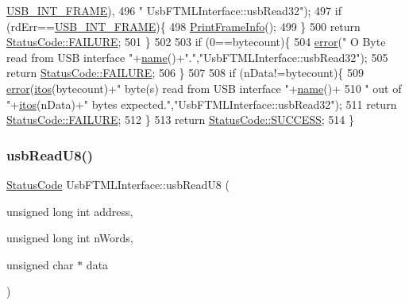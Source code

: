 \begin{DoxyCode}
      \hyperlink{LALUsbML_8h_a68260f9cf3649507d12904cfa1592c11afd1c409187b1dfd3d66887a5e07e7ed3}{USB\_INT\_FRAME}),
496             \textcolor{stringliteral}{" UsbFTMLInterface::usbRead32"});
497     \textcolor{keywordflow}{if} (rdErr==\hyperlink{LALUsbML_8h_a68260f9cf3649507d12904cfa1592c11afd1c409187b1dfd3d66887a5e07e7ed3}{USB\_INT\_FRAME})\{
498       \hyperlink{LALUsbML_8h_ab3398c17204ba7fb4b47eb9bbf4ba94e}{PrintFrameInfo}();
499     \} 
500     \textcolor{keywordflow}{return} \hyperlink{classStatusCode_a6f565cbeadc76d14c72f047e5e85eb4ba3da73d4c469762eb9d3c960368252b26}{StatusCode::FAILURE};
501   \}
502   
503   \textcolor{keywordflow}{if} (0==bytecount)\{
504     \hyperlink{classObject_a204a95f57818c0f811933917a30eff45}{error}(\textcolor{stringliteral}{" O Byte read from USB interface "}+\hyperlink{classObject_a300f4c05dd468c7bb8b3c968868443c1}{name}()+\textcolor{stringliteral}{"."},\textcolor{stringliteral}{"UsbFTMLInterface::usbRead32"});
505     \textcolor{keywordflow}{return} \hyperlink{classStatusCode_a6f565cbeadc76d14c72f047e5e85eb4ba3da73d4c469762eb9d3c960368252b26}{StatusCode::FAILURE};
506   \}
507 
508   \textcolor{keywordflow}{if} (nData!=bytecount)\{
509     \hyperlink{classObject_a204a95f57818c0f811933917a30eff45}{error}(\hyperlink{Tools_8h_af330027dbdafb9a30768b3613c553e60}{itos}(bytecount)+\textcolor{stringliteral}{" byte(s) read from USB interface "}+\hyperlink{classObject_a300f4c05dd468c7bb8b3c968868443c1}{name}()+
510             \textcolor{stringliteral}{" out of "}+\hyperlink{Tools_8h_af330027dbdafb9a30768b3613c553e60}{itos}(nData)+\textcolor{stringliteral}{" bytes expected."},\textcolor{stringliteral}{"UsbFTMLInterface::usbRead32"});
511     \textcolor{keywordflow}{return} \hyperlink{classStatusCode_a6f565cbeadc76d14c72f047e5e85eb4ba3da73d4c469762eb9d3c960368252b26}{StatusCode::FAILURE};    
512   \}
513   \textcolor{keywordflow}{return} \hyperlink{classStatusCode_a6f565cbeadc76d14c72f047e5e85eb4badd0da38d3ba0d922efd1f4619bc37ad8}{StatusCode::SUCCESS};
514 \}
\end{DoxyCode}
\mbox{\label{classUsbFTMLInterface_ac356419a8bbaa26e63f182a86e5fd380}} 
\subsubsection{\texorpdfstring{usb\+Read\+U8()}{usbReadU8()}}
{\footnotesize\ttfamily \hyperlink{classStatusCode}{Status\+Code} Usb\+F\+T\+M\+L\+Interface\+::usb\+Read\+U8 (\begin{DoxyParamCaption}\item[{unsigned long int}]{address,  }\item[{unsigned long int}]{n\+Words,  }\item[{unsigned char $\ast$}]{data }\end{DoxyParamCaption})}

